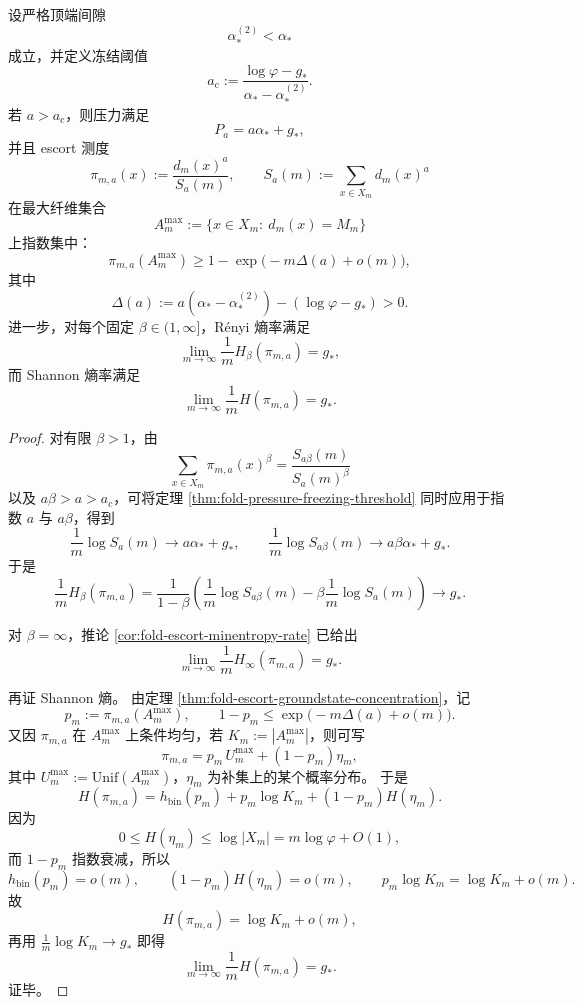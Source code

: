 \begin{theorem}\label{thm:conclusion-frozen-escort-shannon-renyi-collapse}
设严格顶端间隙
\[
\alpha_\ast^{(2)}<\alpha_\ast
\]
成立，并定义冻结阈值
\[
a_{\mathrm c}:=\frac{\log\varphi-g_\ast}{\alpha_\ast-\alpha_\ast^{(2)}}.
\]
若 \(a>a_{\mathrm c}\)，则压力满足
\[
P_a=a\alpha_\ast+g_\ast,
\]
并且 escort 测度
\[
\pi_{m,a}(x):=\frac{d_m(x)^a}{S_a(m)},
\qquad
S_a(m):=\sum_{x\in X_m}d_m(x)^a
\]
在最大纤维集合
\[
A_m^{\max}:=\{x\in X_m:\ d_m(x)=M_m\}
\]
上指数集中：
\[
\pi_{m,a}(A_m^{\max})
\ge
1-\exp\!\bigl(-m\Delta(a)+o(m)\bigr),
\]
其中
\[
\Delta(a):=a(\alpha_\ast-\alpha_\ast^{(2)})-(\log\varphi-g_\ast)>0.
\]
进一步，对每个固定 \(\beta\in(1,\infty]\)，Rényi 熵率满足
\[
\lim_{m\to\infty}\frac{1}{m}H_\beta(\pi_{m,a})=g_\ast,
\]
而 Shannon 熵率满足
\[
\lim_{m\to\infty}\frac{1}{m}H(\pi_{m,a})=g_\ast.
\]
\end{theorem}
\begin{proof}
对有限 \(\beta>1\)，由
\[
\sum_{x\in X_m}\pi_{m,a}(x)^\beta
=
\frac{S_{a\beta}(m)}{S_a(m)^\beta}
\]
以及 \(a\beta>a>a_{\mathrm c}\)，可将定理 \ref{thm:fold-pressure-freezing-threshold} 同时应用于指数 \(a\) 与 \(a\beta\)，得到
\[
\frac{1}{m}\log S_a(m)\to a\alpha_\ast+g_\ast,
\qquad
\frac{1}{m}\log S_{a\beta}(m)\to a\beta\alpha_\ast+g_\ast.
\]
于是
\[
\frac{1}{m}H_\beta(\pi_{m,a})
=
\frac{1}{1-\beta}\left(
\frac{1}{m}\log S_{a\beta}(m)-\beta\frac{1}{m}\log S_a(m)
\right)
\to g_\ast.
\]

对 \(\beta=\infty\)，推论 \ref{cor:fold-escort-minentropy-rate} 已给出
\[
\lim_{m\to\infty}\frac{1}{m}H_\infty(\pi_{m,a})=g_\ast.
\]

再证 Shannon 熵。
由定理 \ref{thm:fold-escort-groundstate-concentration}，记
\[
p_m:=\pi_{m,a}(A_m^{\max}),
\qquad
1-p_m\le \exp\!\bigl(-m\Delta(a)+o(m)\bigr).
\]
又因 \(\pi_{m,a}\) 在 \(A_m^{\max}\) 上条件均匀，若 \(K_m:=|A_m^{\max}|\)，则可写
\[
\pi_{m,a}=p_m\,U_m^{\max}+(1-p_m)\eta_m,
\]
其中 \(U_m^{\max}:=\mathrm{Unif}(A_m^{\max})\)，\(\eta_m\) 为补集上的某个概率分布。
于是
\[
H(\pi_{m,a})
=
h_{\mathrm{bin}}(p_m)+p_m\log K_m+(1-p_m)H(\eta_m).
\]
因为
\[
0\le H(\eta_m)\le \log|X_m|=m\log\varphi+O(1),
\]
而 \(1-p_m\) 指数衰减，所以
\[
h_{\mathrm{bin}}(p_m)=o(m),
\qquad
(1-p_m)H(\eta_m)=o(m),
\qquad
p_m\log K_m=\log K_m+o(m).
\]
故
\[
H(\pi_{m,a})=\log K_m+o(m),
\]
再用 \(\frac{1}{m}\log K_m\to g_\ast\) 即得
\[
\lim_{m\to\infty}\frac{1}{m}H(\pi_{m,a})=g_\ast.
\]
证毕。
\end{proof}

